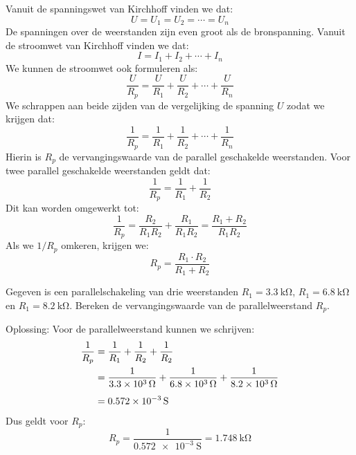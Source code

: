 Vanuit de spanningswet van Kirchhoff vinden we dat:
%
\begin{equation}
U = U_1 = U_2 = \cdots = U_n
\end{equation}
%
De spanningen over de weerstanden zijn even groot als de bronspanning.
Vanuit de stroomwet van Kirchhoff vinden we dat:
%
\begin{equation}
I = I_1 + I_2 + \cdots + I_n
\end{equation}
%
We kunnen de stroomwet ook formuleren als:
%
\begin{equation}
\dfrac{U}{R_p} = \dfrac{U}{R_1} + \dfrac{U}{R_2} + \cdots + \dfrac{U}{R_n}
\end{equation}
%
We schrappen aan beide zijden van de vergelijking de spanning $U$ zodat we krijgen dat:
%
\begin{equation}
\dfrac{1}{R_p} = \dfrac{1}{R_1} + \dfrac{1}{R_2} + \cdots + \dfrac{1}{R_n}
\end{equation}
%
Hierin is $R_p$ de vervangingswaarde van de parallel geschakelde weerstanden.
Voor twee parallel geschakelde weerstanden geldt dat:
\begin{equation}
\dfrac{1}{R_p} = \dfrac{1}{R_1} + \dfrac{1}{R_2}
\end{equation}
%
Dit kan worden omgewerkt tot:
%
\begin{equation}
\dfrac{1}{R_p} = \dfrac{R_2}{R_1R_2} + \dfrac{R_1}{R_1R_2} = \dfrac{R_1+R_2}{R_1R_2}
\end{equation}
%
Als we $1/R_p$ omkeren, krijgen we:
\begin{equation}
R_p = \dfrac{R_1\cdot R_2}{R_1+R_2}
\end{equation}

\begin{example}
Gegeven is een parallelschakeling van drie weerstanden $R_1 = \SI{3.3}{\kilo\ohm}$,
$R_1 = \SI{6.8}{\kilo\ohm}$ en $R_1 = \SI{8.2}{\kilo\ohm}$. Bereken de vervangingswaarde
van de parallelweerstand $R_p$.

Oplossing: Voor de parallelweerstand kunnen we schrijven:
\begin{equation}
\begin{split}
\dfrac{1}{R_p} &= \dfrac{1}{R_1} + \dfrac{1}{R_2} + \dfrac{1}{R_2} \\
               &= \dfrac{1}{\SI{3.3d3}{\ohm}} + \dfrac{1}{\SI{6.8d3}{\ohm}} + \dfrac{1}{\SI{8.2d3}{\ohm}} \\[1ex]
               &= \SI{0,572e-3}{\siemens}
\end{split}
\end{equation}
%
Dus geldt voor $R_p$:
\begin{equation}
R_p = \dfrac{1}{\SI{0,572e-3}{\siemens}} = \SI{1,748}{\kilo\ohm}
\end{equation}
\end{example}

